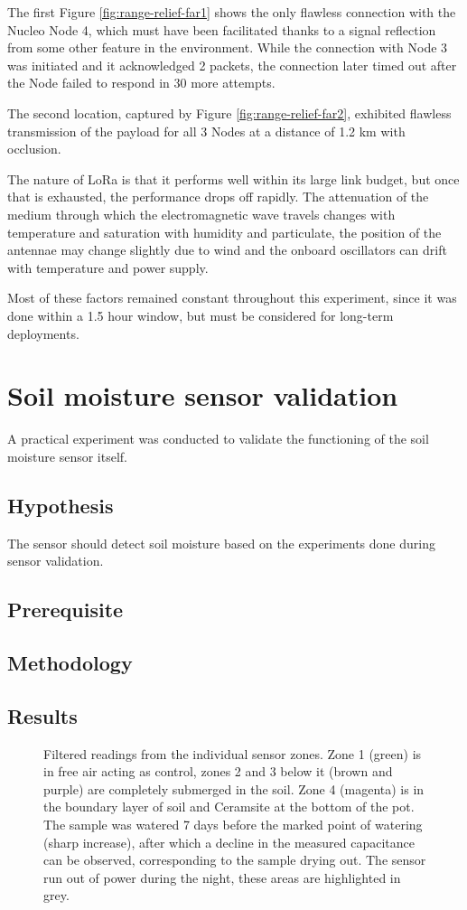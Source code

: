 The first Figure \ref{fig:range-relief-far1} shows the only flawless connection with the Nucleo Node 4, which must have been facilitated thanks to a signal reflection from some other feature in the environment. While the connection with Node 3 was initiated and it acknowledged 2 packets, the connection later timed out after the Node failed to respond in 30 more attempts.

The second location, captured by Figure \ref{fig:range-relief-far2}, exhibited flawless transmission of the payload for all 3 Nodes at a distance of 1.2 km with occlusion.

The nature of LoRa is that it performs well within its large link budget, but once that is exhausted, the performance drops off rapidly. The attenuation of the medium through which the electromagnetic wave travels changes with temperature and saturation with humidity and particulate, the position of the antennae may change slightly due to wind and the onboard oscillators can drift with temperature and power supply.

Most of these factors remained constant throughout this experiment, since it was done within a 1.5 hour window, but must be considered for long-term deployments.

\section{Soil moisture sensor validation}
A practical experiment was conducted to validate the functioning of the soil moisture sensor itself.

\subsection{Hypothesis}
The sensor should detect soil moisture based on the experiments done during sensor validation.

\subsection{Prerequisite}
\subsection{Methodology}
\subsection{Results}

\begin{figure}[p]
    
    \caption{\label{fig:sensor-log}Filtered readings from the individual sensor zones. Zone 1 (green) is in free air acting as control, zones 2 and 3 below it (brown and purple) are completely submerged in the soil. Zone 4 (magenta) is in the boundary layer of soil and Ceramsite at the bottom of the pot. The sample was watered 7 days before the marked point of watering (sharp increase), after which a decline in the measured capacitance can be observed, corresponding to the sample drying out. The sensor run out of power during the night, these areas are highlighted in grey.}
\end{figure}

